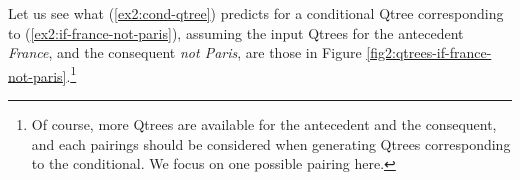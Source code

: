 \begin{exe}
	\label{ex2:cond-qtree}
\end{exe}

Let us see what (\ref{ex2:cond-qtree}) predicts for a conditional Qtree corresponding to (\ref{ex2:if-france-not-paris}), assuming the input Qtrees for the antecedent \textit{France}, and the consequent \textit{not Paris}, are those in Figure \ref{fig2:qtrees-if-france-not-paris}.\footnote{Of course, more Qtrees are available for the antecedent and the consequent, and each pairings should be considered when generating Qtrees corresponding to the conditional. We focus on one possible pairing here.}

\begin{exe}
	\label{ex2:if-france-not-paris}
\end{exe}

